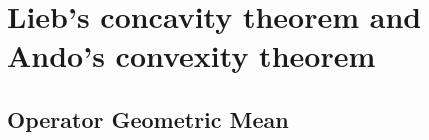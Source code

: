 \chapter{Lieb’s concavity theorem and Ando’s convexity theorem}

\section{Operator Geometric Mean}



